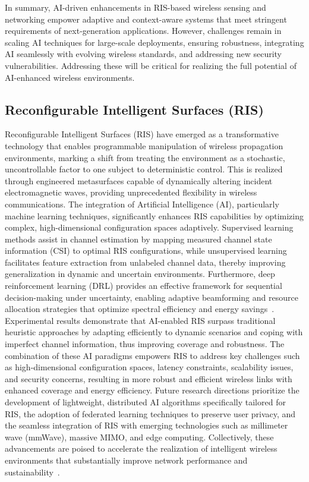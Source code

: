 \documentclass[sigconf]{acmart}
\begin{document}
In summary, AI-driven enhancements in RIS-based wireless sensing and networking empower adaptive and context-aware systems that meet stringent requirements of next-generation applications. However, challenges remain in scaling AI techniques for large-scale deployments, ensuring robustness, integrating AI seamlessly with evolving wireless standards, and addressing new security vulnerabilities. Addressing these will be critical for realizing the full potential of AI-enhanced wireless environments.

\subsection{Reconfigurable Intelligent Surfaces (RIS)}

Reconfigurable Intelligent Surfaces (RIS) have emerged as a transformative technology that enables programmable manipulation of wireless propagation environments, marking a shift from treating the environment as a stochastic, uncontrollable factor to one subject to deterministic control. This is realized through engineered metasurfaces capable of dynamically altering incident electromagnetic waves, providing unprecedented flexibility in wireless communications. The integration of Artificial Intelligence (AI), particularly machine learning techniques, significantly enhances RIS capabilities by optimizing complex, high-dimensional configuration spaces adaptively. Supervised learning methods assist in channel estimation by mapping measured channel state information (CSI) to optimal RIS configurations, while unsupervised learning facilitates feature extraction from unlabeled channel data, thereby improving generalization in dynamic and uncertain environments. Furthermore, deep reinforcement learning (DRL) provides an effective framework for sequential decision-making under uncertainty, enabling adaptive beamforming and resource allocation strategies that optimize spectral efficiency and energy savings~\cite{ref49}. Experimental results demonstrate that AI-enabled RIS surpass traditional heuristic approaches by adapting efficiently to dynamic scenarios and coping with imperfect channel information, thus improving coverage and robustness. The combination of these AI paradigms empowers RIS to address key challenges such as high-dimensional configuration spaces, latency constraints, scalability issues, and security concerns, resulting in more robust and efficient wireless links with enhanced coverage and energy efficiency. Future research directions prioritize the development of lightweight, distributed AI algorithms specifically tailored for RIS, the adoption of federated learning techniques to preserve user privacy, and the seamless integration of RIS with emerging technologies such as millimeter wave (mmWave), massive MIMO, and edge computing. Collectively, these advancements are poised to accelerate the realization of intelligent wireless environments that substantially improve network performance and sustainability~\cite{ref49}.
\end{document}
